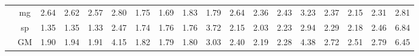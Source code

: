 \begin{table*}[]
\begin{center}
{\begin{tabular}{|c|c|rrrr|rrrr|rrrr|rrrr|}
 &  mg  &  2.64  & \cellcolor{blue!25} 2.62  & \cellcolor{blue!25} 2.57  &   2.80  &  1.75  & \cellcolor{blue!25} 1.69  &  1.83  &  1.79  &  2.64  & \cellcolor{blue!25} 2.36  &  2.43  &   3.23  &  2.37  & \cellcolor{blue!25} 2.15  &  2.31  &   2.81 \\
 &  sp  &  1.35  &  1.35  & \cellcolor{blue!25} 1.33  &   2.47  &  1.74  &  1.76  &  1.76  &  3.72  &  2.15  & \cellcolor{blue!25} 2.03  &  2.23  &   2.94  &  2.29  & \cellcolor{blue!25} 2.18  &  2.46  &   6.84 \\ \cline{2-18}
 &  GM  &  1.90  &  1.94  & \cellcolor{blue!25} 1.91  &   4.15  &  1.82  & \cellcolor{blue!25} 1.79  &  1.80  &  3.03  &  2.40  & \cellcolor{blue!25} 2.19  &  2.28  &   4.38  &  2.72  & \cellcolor{blue!25} 2.51  &  2.79  &   6.45 \\
\hline 
\end{tabular} }

\end{center}
\end{table*}
